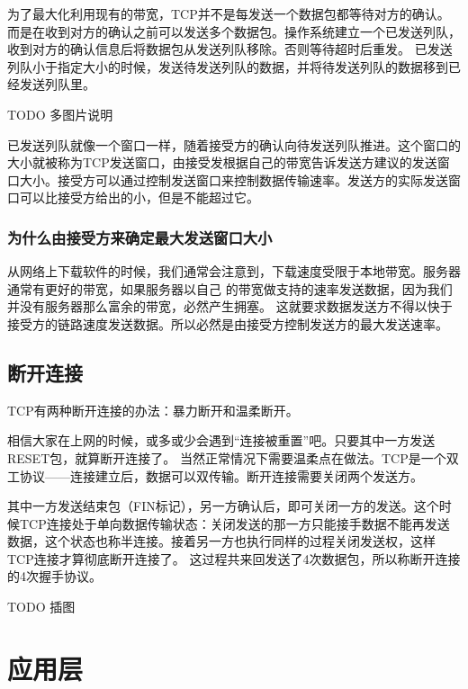为了最大化利用现有的带宽，TCP并不是每发送一个数据包都等待对方的确认。而是在收到对方的确认之前可以发送多个数据包。操作系统建立一个已发送列队，收到对方的确认信息后将数据包从发送列队移除。否则等待超时后重发。
已发送列队小于指定大小的时候，发送待发送列队的数据，并将待发送列队的数据移到已经发送列队里。

TODO 多图片说明 %

已发送列队就像一个窗口一样，随着接受方的确认向待发送列队推进。这个窗口的大小就被称为TCP发送窗口，由接受发根据自己的带宽告诉发送方建议的发送窗口大小。接受方可以通过控制发送窗口来控制数据传输速率。发送方的实际发送窗口可以比接受方给出的小，但是不能超过它。

\begin{insertnote}
\subsubsection*{为什么由接受方来确定最大发送窗口大小}
从网络上下载软件的时候，我们通常会注意到，下载速度受限于本地带宽。服务器通常有更好的带宽，如果服务器以自己
的带宽做支持的速率发送数据，因为我们并没有服务器那么富余的带宽，必然产生拥塞。
这就要求数据发送方不得以快于接受方的链路速度发送数据。所以必然是由接受方控制发送方的最大发送速率。

\end{insertnote}

\subsection{断开连接}

TCP有两种断开连接的办法：暴力断开和温柔断开。

相信大家在上网的时候，或多或少会遇到“连接被重置”吧。只要其中一方发送RESET包，就算断开连接了。
当然正常情况下需要温柔点在做法。TCP是一个双工协议——连接建立后，数据可以双传输。断开连接需要关闭两个发送方。

其中一方发送结束包（FIN标记），另一方确认后，即可关闭一方的发送。这个时候TCP连接处于单向数据传输状态：关闭发送的那一方只能接手数据不能再发送数据，这个状态也称半连接。接着另一方也执行同样的过程关闭发送权，这样TCP连接才算彻底断开连接了。
这过程共来回发送了4次数据包，所以称断开连接的4次握手协议。


TODO 插图


\section{应用层}

